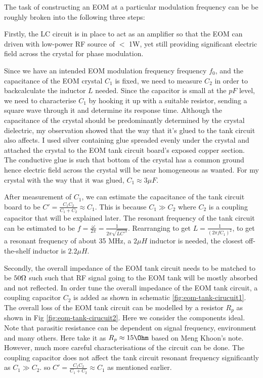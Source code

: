 \documentclass[12pt]{report}
\begin{document}
The task of constructing an EOM at a particular modulation frequency can be be roughly broken into the following three steps:
\par
Firstly, the LC circuit is in place to act as an amplifier so that the EOM can driven with low-power RF source of $<$ 1W, yet still providing significant electric field across the crystal for phase modulation. 
\par
Since we have an intended EOM modulation frequency frequency $f_0$, and the capacitance of the EOM crystal $C_1$ is fixed, we need to measure $C_2$ in order to backcalculate the inductor $L$ needed. Since the capacitor is small at the $pF$ level, we need to characterise $C_1$ by hooking it up with a suitable resistor, sending a square wave through it and determine its response time. Although the capacitance of the crystal should be predominantly determined by the crystal dielectric, my observation showed that the way that it's glued to the tank circuit also affects. I used silver containing glue spreaded evenly under the crystal and attached the crystal to the EOM tank circuit board's exposed copper section. The conductive glue is such that bottom of the crystal has a common ground hence electric field across the crystal will be near homogeneous as wanted. For my crystal with the way that it was glued, $C_1 \approx 3 \mu F$.
\par
After measurement of $C_1$, we can estimate the capacitance of the tank circuit board to be $C' = \frac{C_1C_2}{C_1+C_2} \approx C_1$. This is because $C_1 \gg C_2$ where $C_2$ is a coupling capacitor that will be explained later. The resonant frequency of the tank circuit can be estimated to be $f = \frac{\omega}{2\pi} = \frac{1}{2\pi\sqrt{LC'^2}}$. Rearranging to get $L = \frac{1}{(2\pi f C_1)^2}$, to get a resonant frequency of about 35 MHz, a $2 \mu H$ inductor is needed, the closest off-the-shelf inductor is $2.2 \mu H$. 
\par
Secondly, the overall impedance of the EOM tank circuit needs to be matched to be $50\ohm$ such such that RF signal going to the EOM tank will be mostly absorbed and not reflected. In order tune the overall impedance of the EOM tank circuit, a coupling capacitor $C_2$ is added as shown in schematic \ref{fig:eom-tank-cirucuit1}. The overall loss of the EOM tank circuit can be modelled by a resistor $R_p$ as shown in Fig \ref{fig:eom-tank-cirucuit2}. Here we consider the components ideal. Note that parasitic resistance can be dependent on signal frequency, environment and many others. Here take it as $ R_p \approx 15 \Ohm$ based on Meng Khoon's note. However, much more careful characterisations of the circuit can be done. The coupling capacitor does not affect the tank circuit resonant frequency significantly as $C_1 \gg C_2$. so $C' = \frac{C_1C_2}{C_1+C_2} \approx C_1$ as mentioned earlier.  
\end{document}
